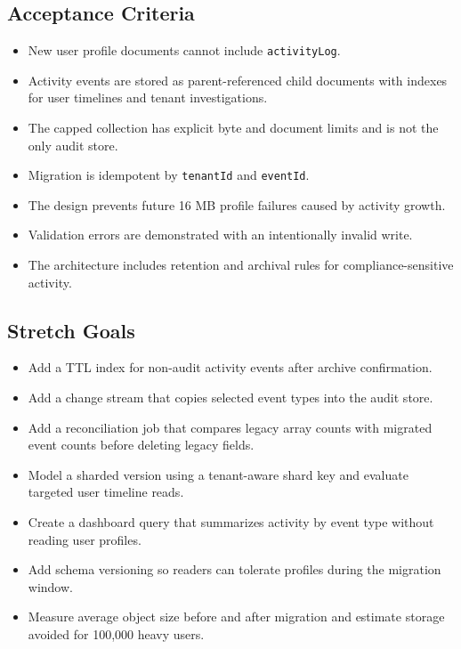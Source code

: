 \subsection*{Acceptance Criteria}
\begin{itemize}
    \item New user profile documents cannot include \texttt{activityLog}.
    \item Activity events are stored as parent-referenced child documents with indexes for user timelines and tenant investigations.
    \item The capped collection has explicit byte and document limits and is not the only audit store.
    \item Migration is idempotent by \texttt{tenantId} and \texttt{eventId}.
    \item The design prevents future 16 MB profile failures caused by activity growth.
    \item Validation errors are demonstrated with an intentionally invalid write.
    \item The architecture includes retention and archival rules for compliance-sensitive activity.
\end{itemize}

\subsection*{Stretch Goals}
\begin{itemize}
    \item Add a TTL index for non-audit activity events after archive confirmation.
    \item Add a change stream that copies selected event types into the audit store.
    \item Add a reconciliation job that compares legacy array counts with migrated event counts before deleting legacy fields.
    \item Model a sharded version using a tenant-aware shard key and evaluate targeted user timeline reads.
    \item Create a dashboard query that summarizes activity by event type without reading user profiles.
    \item Add schema versioning so readers can tolerate profiles during the migration window.
    \item Measure average object size before and after migration and estimate storage avoided for 100,000 heavy users.
\end{itemize}
